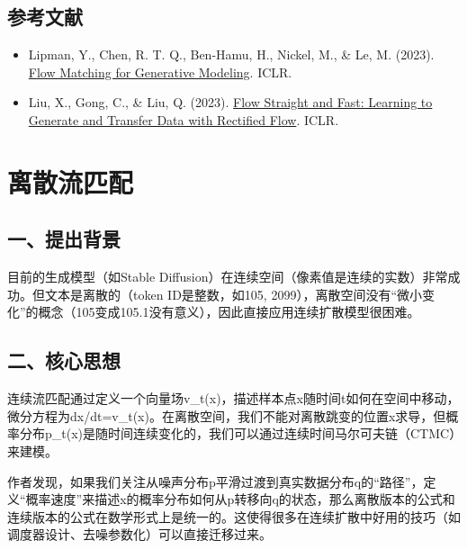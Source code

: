 \hypertarget{ux53c2ux8003ux6587ux732e-135}{%
\subsection{参考文献}\label{ux53c2ux8003ux6587ux732e-135}}

\vspace{0.25em}
\begin{itemize}
\tightlist
\item
  Lipman, Y., Chen, R. T. Q., Ben-Hamu, H., Nickel, M., \& Le, M. (2023). \href{https://arxiv.org/abs/2210.02747}{Flow Matching for Generative Modeling}. ICLR.
\item
  Liu, X., Gong, C., \& Liu, Q. (2023). \href{https://arxiv.org/abs/2209.03003}{Flow Straight and Fast: Learning to Generate and Transfer Data with Rectified Flow}. ICLR.
\end{itemize}

\clearpage

\hypertarget{ux79bbux6563ux6d41ux5339ux914d}{%
\section{离散流匹配}\label{ux79bbux6563ux6d41ux5339ux914d}}

\hypertarget{ux4e00ux63d0ux51faux80ccux666f-3}{%
\subsection{一、提出背景}\label{ux4e00ux63d0ux51faux80ccux666f-3}}

目前的生成模型（如Stable Diffusion）在连续空间（像素值是连续的实数）非常成功。但文本是离散的（token ID是整数，如105, 2099），离散空间没有``微小变化''的概念（105变成105.1没有意义），因此直接应用连续扩散模型很困难。

\hypertarget{ux4e8cux6838ux5fc3ux601dux60f3-3}{%
\subsection{二、核心思想}\label{ux4e8cux6838ux5fc3ux601dux60f3-3}}

连续流匹配通过定义一个向量场v\_t(x)，描述样本点x随时间t如何在空间中移动，微分方程为dx/dt=v\_t(x)。在离散空间，我们不能对离散跳变的位置x求导，但概率分布p\_t(x)是随时间连续变化的，我们可以通过连续时间马尔可夫链（CTMC）来建模。

作者发现，如果我们关注从噪声分布p平滑过渡到真实数据分布q的``路径''，定义``概率速度''来描述x的概率分布如何从p转移向q的状态，那么离散版本的公式和连续版本的公式在数学形式上是统一的。这使得很多在连续扩散中好用的技巧（如调度器设计、去噪参数化）可以直接迁移过来。

